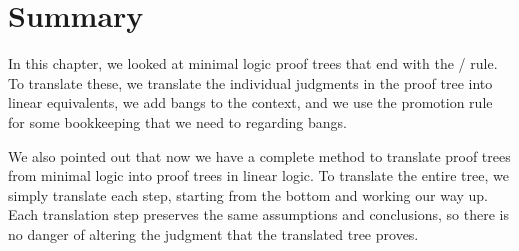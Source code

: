 \documentclass[../../../main.tex]{subfiles}
\begin{document}
\section{Summary}

In this chapter, we looked at minimal logic proof trees that end with the \implElim/ rule. To translate these, we translate the individual judgments in the proof tree into linear equivalents, we add bangs to the context, and we use the promotion rule for some bookkeeping that we need to regarding bangs.

We also pointed out that now we have a complete method to translate proof trees from minimal logic into proof trees in linear logic. To translate the entire tree, we simply translate each step, starting from the bottom and working our way up. Each translation step preserves the same assumptions and conclusions, so there is no danger of altering the judgment that the translated tree proves.
\end{document}
